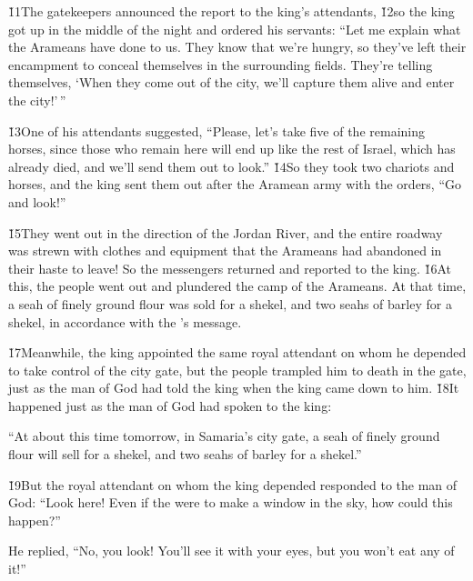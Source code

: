\v{11}The gatekeepers announced the report to the king's attendants, \v{12}so the king got up in the middle of the night and ordered his servants: ``Let me explain what the Arameans have done to us. They know that we're hungry, so they've left their encampment to conceal themselves in the surrounding fields. They're telling themselves, `When they come out of the city, we'll capture them alive and enter the city!'\,''

\v{13}One of his attendants suggested, ``Please, let's take five of the remaining horses, since those who remain here will end up like the rest of Israel, which has already died, and we'll send them out to look.'' \v{14}So they took two chariots and horses, and the king sent them out after the Aramean army with the orders, ``Go and look!''

\v{15}They went out in the direction of the Jordan River, and the entire roadway was strewn with clothes and equipment that the Arameans had abandoned in their haste to leave! So the messengers returned and reported to the king. \v{16}At this, the people went out and plundered the camp of the Arameans. At that time, a seah of finely ground flour was sold for a shekel, and two seahs of barley for a shekel, in accordance with the 's message.

\v{17}Meanwhile, the king appointed the same royal attendant on whom he depended to take control of the city gate, but the people trampled him to death in the gate, just as the man of God had told the king when the king came down to him. \v{18}It happened just as the man of God had spoken to the king:

\begin{poetry}
\poeml ``At about this time tomorrow, in Samaria's city gate, a seah of finely ground flour will sell for a shekel, and two seahs of barley for a shekel.''
\end{poetry}

\v{19}But the royal attendant on whom the king depended responded to the man of God: ``Look here! Even if the  were to make a window in the sky, how could this happen?''

He replied, ``No, you look! You'll see it with your eyes, but you won't eat any of it!''

